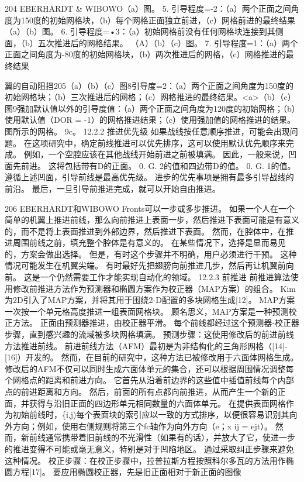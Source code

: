 \documentclass[UTF8,11pt,a4paper,openany,fontset=fandol]{ctexbook}
\begin{document}
204 EBERHARDT \& WIBOWO（a）图。 5. 引导程度=-2：（a）两个正面之间角度为150度的初始网格块，（b）每个网格正面独立前进，（c）网格前进的最终结果（a）（b）图。 6. 引导程度=•3：（a）初始网格前没有任何网格块连接到其侧面，（b）五次推进后的网格结果。 （A）（b）（c）图。 7. 引导程度=1：（a）两个正面之间角度为-80度的初始网格块，（b）两次推进后的网格，（c）网格推进的最终结果

翼的自动阻挡205（a）（b）（c）图8引导度=2：（a）两个正面之间角度为150度的初始网格块；（b）三次推进后的网格；（c）网格推进的最终结果。<a>（b）（c）图9强加默认值以外的引导度值：（a）两个正面之间角度为120度的初始网格；（b）使用默认值（DOR = -1）的网格推进结果；（c）使用强加值的网格推进的结果。图所示的网格。 9c。 12.2.2 推进优先级 如果战线按任意顺序推进，可能会出现问题。 在这项研究中，确定前线推进可以优先排序，这可以使用默认优先顺序来完成。 例如，一个空腔应该在其他战线开始前进之前被填满。 因此，一般来说，凹面先前进。 这将包括带有D的正面。 0. G. 2的值和四边带D的值。 0. G. 1的值。 遵循上述凹面，引导前线是最高优先级。 进步的优先事项是拥有最多引导战线的前沿。 最后，一旦引导前推进完成，就可以开始自由推进。

206 EBERHARDT和WIBOWO Fronts可以一步或多步推进。 如果一个人在一个简单的机翼上推进前线，那么向前推进上表面一步，然后推进下表面可能是有意义的，而不是将上表面推进到外部边界，然后推进下表面。 然而，在腔体中，在推进周围前线之前，填充整个腔体是有意义的。 在某些情况下，选择是显而易见的，方案会做出选择。 但是，有时这个步骤并不明确，用户必须进行干预。 这种情况可能发生在机翼尖端。 有时最好先把翅膀向前推进几步，然后再让机翼前向前。 这是一个仍然需要工作才能实现自动化的领域。 12.2.3 前推进 前推进算法使用修改前推进方法作为预测器和椭圆方案作为校正器（MAP方案）的组合。 Kim为2D引入了MAP方案，并将其用于围绕2-D配置的多块网格生成[12]。 MAP方案一次按一个单元格高度推进一组表面网格块。 顾名思义，MAP方案是一种预测校正方法。 正面由预测器推进，由校正器平滑。 每个前线都经过这个预测器-校正器步骤，直到感兴趣的流域被多块网格填满。 预测步骤：这使用修改后的前进前线方法推进前线。 前进前线方法（AFM）最初是为非结构化的三角形网格（[14]-[16]）开发的。 然而，在目前的研究中，这种方法已被修改用于六面体网格生成。 修改后的AFM不仅可以同时生成六面体单元的集合，还可以根据周围情况调整每个网格点的距离和前进方向。 它首先从沿着前边界的这些值中插值前线每个内部点的前进距离和方向。 然后，前面的所有点都向前推进，从而产生一个新的正面，并获得与沿旧正面的四边形单元相同数量的六面体单元。 在提供表面网格作为初始前线时，\{i,j)每个表面块的索引应以一致的方式排序，以便很容易识别其向外方向；例如，使用右侧规则将第三个fc轴作为向外方向（e；x ij = ejt）。 然而，新前线通常携带着旧前线的不光滑性（如果有的话），并放大了它，使进一步的推进变得不可能或毫无意义，特别是对于凹陷地区。 通过采取纠正步骤来避免这种情况。 校正步骤：在校正步骤中，拉普拉斯方程按照科尔多瓦的方法用作椭圆方程[17]。 要应用椭圆校正器，先是旧正面相对于新正面的图像
\end{document}
